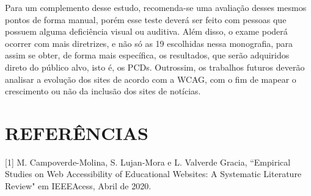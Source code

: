 \documentclass[a4paper]{article}
\begin{document}
\begin{titlepage}
Para um complemento desse estudo, recomenda-se uma avaliação desses mesmos pontos de forma manual, porém esse teste deverá ser feito com pessoas que possuem alguma deficiência visual ou auditiva. Além disso, o exame poderá ocorrer com mais diretrizes, e não só as 19 escolhidas nessa monografia, para assim se obter, de forma mais específica, os resultados, que serão adquiridos direto do público alvo, isto é, os PCDs. Outrossim, os trabalhos futuros deverão analisar a evolução dos sites de acordo com a WCAG, com o fim de mapear o crescimento ou não da inclusão dos sites de notícias.

\section*{REFERÊNCIAS}
\hspace{-0.05\textwidth}
\begin{minipage}{1\textwidth}
[1] M. Campoverde-Molina, S. Lujan-Mora e L. Valverde Gracia, ``Empirical Studies on Web Accessibility of Educational Websites: A Systematic Literature Review" em IEEEAcess, Abril de 2020.

\end{minipage}
\end{titlepage}
\end{document}
